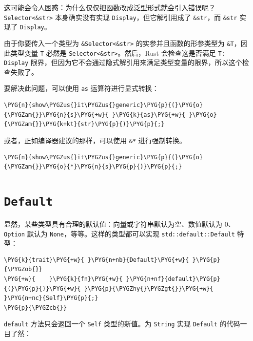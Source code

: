 这可能会令人困惑：为什么仅仅把函数改成泛型形式就会引入错误呢？\texttt{Selector<\&str>} 本身确实没有实现 \texttt{Display}，但它解引用成了 \texttt{\&str}，而 \texttt{\&str} 实现了 \texttt{Display}。

由于你要传入一个类型为 \texttt{\&Selector<\&str>} 的实参并且函数的形参类型为 \texttt{\&T}，因此类型变量 \texttt{T} 必然是 \texttt{Selector<\&str>}。然后，Rust 会检查这是否满足 \texttt{T: Display} 限界，但因为它不会通过隐式解引用来满足类型变量的限界，所以这个检查失败了。

要解决此问题，可以使用 \texttt{as} 运算符进行显式转换：

\begin{Verbatim}[commandchars=\\\{\},breaklines=true,breakanywhere=true,fontsize=\codefont,xleftmargin=17bp]
\PYG{n}{show\PYGZus{}it\PYGZus{}generic}\PYG{p}{(}\PYG{o}{\PYGZam{}}\PYG{n}{s}\PYG{+w}{ }\PYG{k}{as}\PYG{+w}{ }\PYG{o}{\PYGZam{}}\PYG{k+kt}{str}\PYG{p}{)}\PYG{p}{;}
\end{Verbatim}

或者，正如编译器建议的那样，可以使用 \texttt{\&*} 进行强制转换。

\begin{Verbatim}[commandchars=\\\{\},breaklines=true,breakanywhere=true,fontsize=\codefont,xleftmargin=17bp]
\PYG{n}{show\PYGZus{}it\PYGZus{}generic}\PYG{p}{(}\PYG{o}{\PYGZam{}}\PYG{o}{*}\PYG{n}{s}\PYG{p}{)}\PYG{p}{;}
\end{Verbatim}

\section{\texttt{Default}}

显然，某些类型具有合理的默认值：向量或字符串默认为空、数值默认为 0、\texttt{Option} 默认为 \texttt{None}，等等。这样的类型都可以实现 \texttt{std::default::Default} 特型：

\begin{Verbatim}[commandchars=\\\{\},breaklines=true,breakanywhere=true,fontsize=\codefont,xleftmargin=17bp]
\PYG{k}{trait}\PYG{+w}{ }\PYG{n+nb}{Default}\PYG{+w}{ }\PYG{p}{\PYGZob{}}
\PYG{+w}{    }\PYG{k}{fn}\PYG{+w}{ }\PYG{n+nf}{default}\PYG{p}{(}\PYG{p}{)}\PYG{+w}{ }\PYG{p}{\PYGZhy{}\PYGZgt{}}\PYG{+w}{ }\PYG{n+nc}{Self}\PYG{p}{;}
\PYG{p}{\PYGZcb{}}
\end{Verbatim}

\texttt{default} 方法只会返回一个 \texttt{Self} 类型的新值。为 \texttt{String} 实现 \texttt{Default} 的代码一目了然：

